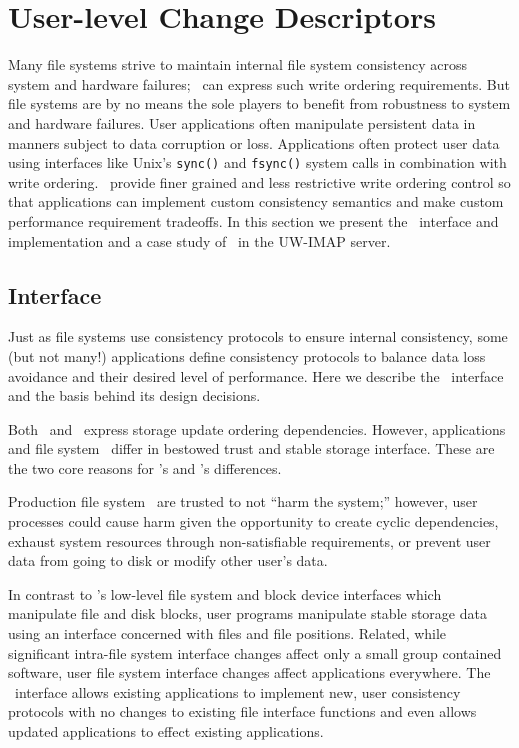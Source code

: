 \section{User-level Change Descriptors}
\label{sec:opgroup}
Many file systems strive to maintain internal file system consistency
across system and hardware failures; \chdescs\ can express such write
ordering requirements. But file systems are by no means the sole
players to benefit from robustness to system and hardware failures.
User applications often manipulate persistent data in manners subject
to data corruption or loss. Applications often protect user data using
interfaces like Unix's \texttt{sync()} and \texttt{fsync()} system
calls in combination with write ordering.  \Opgroups\ provide finer
grained and less restrictive write ordering control so that
applications can implement custom consistency semantics and make
custom performance requirement tradeoffs. In this section we present
the \opgroup\ interface and implementation and a case study of
\opgroups\ in the UW-IMAP server.

\subsection{Interface}
\label{sec:opgroup:interface}
Just as file systems use consistency protocols to ensure internal
consistency, some (but not many!) applications define consistency
protocols to balance data loss avoidance and their desired level of
performance. Here we describe the \opgroup\ interface and the basis
behind its design decisions.

Both \opgroups\ and \chdescs\ express storage update ordering
dependencies. However, applications and file system \modules\ differ
in bestowed trust and stable storage interface. These are the two core
reasons for \opgroup{}'s and \chdesc{}'s differences.

Production file system \modules\ are trusted to not ``harm the
system;'' however, user processes could cause harm given the
opportunity to create cyclic dependencies, exhaust system resources
through non-satisfiable requirements, or prevent user data from going
to disk or modify other user's data.

In contrast to \Kudos{}'s low-level file system and block device
interfaces which manipulate file and disk blocks, user programs
manipulate stable storage data using an interface concerned with files
and file positions.
%
Related, while significant intra-file system interface changes affect
only a small group contained software, user file system interface
changes affect applications everywhere. The \opgroup\ interface allows
existing applications to implement new, user consistency protocols
with no changes to existing file interface functions and even allows
updated applications to effect existing applications.


